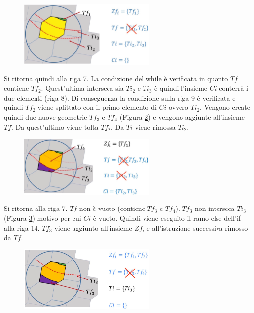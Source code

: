 \begin{figure}[h]
	\centering
	\includegraphics[width=0.6\textwidth]{images/pseudo3}
	\caption{}
	\label{pseudo3}
\end{figure}

Si ritorna quindi alla riga 7. La condizione del while è verificata in quanto  $Tf$ contiene $Tf_2$. Quest'ultima interseca sia $Ti_2$ e $Ti_3$ è quindi l'insieme $Ci$ conterrà i due elementi (riga 8). Di conseguenza la condizione sulla riga 9 è verificata e quindi $Tf_2$ viene splittato con il primo elemento di $Ci$ ovvero $Ti_2$. Vengono create quindi due nuove geometrie $Tf_3$ e $Tf_4$ (Figura \ref{pseudo4}) e vengono aggiunte all'insieme $Tf$. Da quest'ultimo viene tolta $Tf_2$. Da $Ti$ viene rimossa $Ti_2$.
	
\begin{figure}[h]
	\centering
	\includegraphics[width=0.6\textwidth]{images/pseudo4}
	\caption{}
	\label{pseudo4}
\end{figure}

Si ritorna alla riga 7. $Tf$ non è vuoto (contiene $Tf_3$ e $Tf_4$). $Tf_3$ non interseca $Ti_3$ (Figura \ref{pseudo5}) motivo per cui $Ci$ è vuoto. Quindi viene eseguito il ramo else dell'if alla riga 14. $Tf_3$ viene aggiunto all'insieme $Zf_i$ e all'istruzione successiva rimosso da $Tf$.
	
\begin{figure}[h]
	\centering
	\includegraphics[width=0.6\textwidth]{images/pseudo5}
	\caption{}
	\label{pseudo5}
\end{figure}

